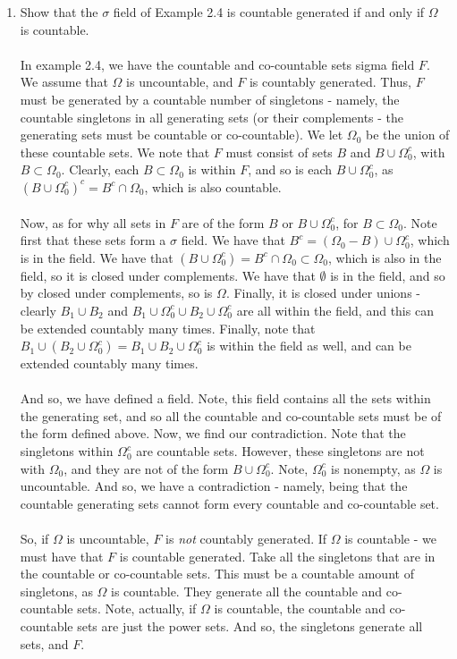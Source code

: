 \documentclass[12pt,a4paper]{article}
\newcommand{\1}[1]{\mathbbm{1}\left\{ #1 \right\}}
\begin{document}
\begin{enumerate}
	\item Show that the $\sigma$ field of Example 2.4 is countable generated if and only if $\Omega$ is countable.
	\\\\
	In example 2.4, we have the countable and co-countable sets sigma field $F$. We assume that $\Omega$ is uncountable, and $F$ is countably generated. Thus, $F$ must be generated by a countable number of singletons - namely, the countable singletons in all generating sets (or their complements - the generating sets must be countable or co-countable). We let $\Omega_0$ be the union of these countable sets. We note that $F$ must consist of sets $B$ and $B \cup \Omega_0^c$, with $B \subset \Omega_0$. Clearly, each $B \subset \Omega_0$ is within $F$, and so is each $B \cup \Omega_0^c$, as $(B \cup \Omega_0^c)^c = B^c \cap \Omega_0$, which is also countable. 
	\\\\
	Now, as for why all sets in $F$ are of the form $B$ or $B \cup \Omega_0^c$, for $B \subset \Omega_0$. Note first that these sets form a $\sigma$ field. We have that $B^c = (\Omega_0 - B) \cup \Omega_0^c$, which is in the field. We have that $(B \cup \Omega_0^c) = B^c \cap \Omega_0 \subset \Omega_0$, which is also in the field, so it is closed under complements. We have that $\emptyset$ is in the field, and so by closed under complements, so is $\Omega$. Finally, it is closed under unions - clearly $B_1 \cup B_2$ and $B_1 \cup \Omega_0^c \cup B_2 \cup \Omega_0^c$ are all within the field, and this can be extended countably many times. Finally, note that $B_1 \cup (B_2 \cup \Omega_0^c) = B_1 \cup B_2 \cup \Omega_0^c$ is within the field as well, and can be extended countably many times.
	\\\\
	And so, we have defined a field. Note, this field contains all the sets within the generating set, and so all the countable and co-countable sets must be of the form defined above. Now, we find our contradiction. Note that the singletons within $\Omega_0^c$ are countable sets. However, these singletons are not with $\Omega_0$, and they are not of the form $B \cup \Omega_0^c$. Note, $\Omega_0^c$ is nonempty, as $\Omega$ is uncountable. And so, we have a contradiction - namely, being that the countable generating sets cannot form every countable and co-countable set.
	\\\\
	So, if $\Omega$ is uncountable, $F$ is \textit{not} countably generated. If $\Omega$ is countable - we must have that $F$ is countable generated. Take all the singletons that are in the countable or co-countable sets. This must be a countable amount of singletons, as $\Omega$ is countable. They generate all the countable and co-countable sets. Note, actually, if $\Omega$ is countable, the countable and co-countable sets are just the power sets. And so, the singletons generate all sets, and $F$.
	

\end{enumerate}
\end{document}
